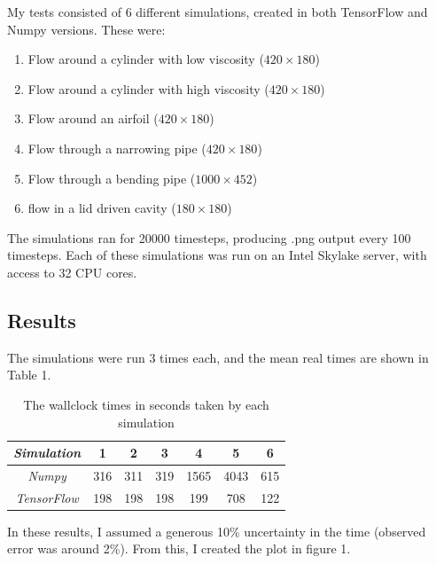 \documentclass{article}
\begin{document}
My tests consisted of 6 different simulations, created in both TensorFlow and Numpy versions. These were:

\begin{enumerate}
    \item Flow around a cylinder with low viscosity ($420\times180$)
    \item Flow around a cylinder with high viscosity ($420\times180$)
    \item Flow around an airfoil ($420\times180$)
    \item Flow through a narrowing pipe ($420\times180$)
    \item Flow through a bending pipe ($1000\times452$)
    \item flow in a lid driven cavity ($180\times180$)
\end{enumerate}

The simulations ran for 20000 timesteps, producing .png output every 100 timesteps. Each of these simulations was run on an Intel Skylake server, with access to 32 CPU cores.

\subsection{Results}

The simulations were run 3 times each, and the mean real times are shown in Table 1. 

\begin{table}[H]
\caption{The wallclock times in seconds taken by each simulation}
\begin{center}
\begin{tabular}{c||c|c|c|c|c|c}
\emph{Simulation} & 1 & 2 & 3 & 4 & 5 & 6\\
\hline
\hline
\emph{Numpy} & 316 & 311 & 319 & 1565 & 4043 & 615 \\
\hline
\emph{TensorFlow} & 198 & 198 & 198 & 199 & 708 & 122 \\
\hline
\end{tabular}
\end{center}
\end{table}

In these results, I assumed a generous 10\% uncertainty in the time (observed error was around 2\%). From this, I created the plot in figure 1.
\end{document}
